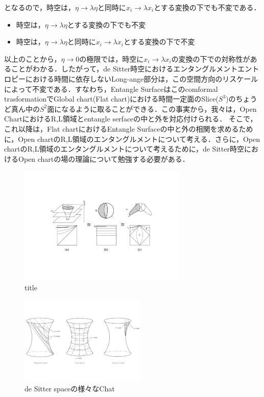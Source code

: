 となるので，時空は，$\eta\to\lambda\eta$と同時に$x_{i}\to\lambda x_{i}$とする変換の下でも不変である．
\begin{itemize}
  \item{時空は，$\eta\to\lambda\eta$とする変換の下でも不変}
  \item{時空は，$\eta\to\lambda\eta$と同時に$x_{i}\to\lambda x_{i}$とする変換の下で不変}
\end{itemize}
以上のことから，$\eta\to0$の極限では，時空に$x_{i}\to\lambda x_{i}$の変換の下での対称性があることがわかる．したがって，de Sitter時空におけるエンタングルメントエントロピーにおける時間に依存しないLong-ange部分は，この空間方向のリスケールによって不変である．すなわち，Entangle Surfaceはこのcomformal trasformationでGlobal chart(Flat chart)における時間一定面のSlice($S^3$)のちょうど真ん中の$S^2$面になるように取ることができる．この事実から，我々は，Open ChartにおけるR,L領域とentangle serfaceの中と外を対応付けられる．
そこで，これ以降は，Flat chartにおけるEntangle Surfaceの中と外の相関を求めるために，Open chartのR,L領域のエンタングルメントについて考える．さらに，Open chartのR,L領域のエンタングルメントについて考えるために，de Sitter時空におけるOpen chartの場の理論について勉強する必要がある．


  \begin{figure}[H]
    \begin{center}
    \includegraphics[width=8cm,angle=270]{de.pdf}
    \caption{title}
    \end{center}
  \end{figure}

  \begin{figure}[H]
    \begin{center}
    \includegraphics[width=6cm,angle=270]{Web.pdf}
    \caption{de Sitter spaceの様々なChat}
    \label{vchart}
    \end{center}
  \end{figure}

